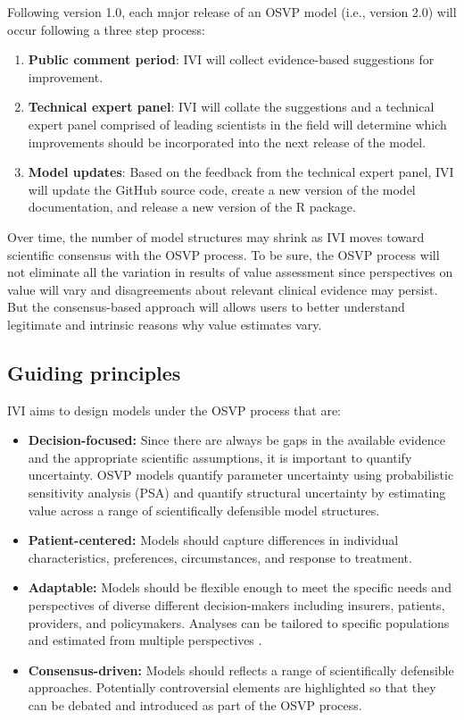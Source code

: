 \documentclass[11pt,final,fleqn]{article}\usepackage[]{graphicx}\usepackage[]{color}
\theoremstyle{plain}
\begin{document}
Following version 1.0, each major release of an OSVP model (i.e., version 2.0) will occur following a three step process:

\begin{enumerate}
\item \textbf{Public comment period}: IVI will collect evidence-based suggestions for improvement. 
\item \textbf{Technical expert panel}: IVI will collate the suggestions and a technical expert panel comprised of leading scientists in the field will determine which improvements should be incorporated into the next release of the model.
\item \textbf{Model updates}: Based on the feedback from the technical expert panel, IVI will update the GitHub source code, create a new version of the model documentation, and release a new version of the R package. 
\end{enumerate}

Over time, the number of model structures may shrink as IVI moves toward scientific consensus with the OSVP process. To be sure, the OSVP process will not eliminate all the variation in results of value assessment since perspectives on value will vary and disagreements about relevant clinical evidence may persist. But the consensus-based approach will allows users to better understand legitimate and intrinsic reasons why value estimates vary.

\subsection*{Guiding principles}
IVI aims to design models under the OSVP process that are:

\begin{itemize}
\item \textbf{Decision-focused:} Since there are always be gaps in the available evidence and the appropriate scientific assumptions, it is important to quantify uncertainty. OSVP models quantify parameter uncertainty using probabilistic sensitivity analysis (PSA) and quantify structural uncertainty by estimating value across a range of scientifically defensible model structures.
\item \textbf{Patient-centered:} Models should capture differences in individual characteristics, preferences, circumstances, and response to treatment.
\item \textbf{Adaptable:} Models should be flexible enough to meet the specific needs and perspectives of diverse different decision-makers including insurers, patients, providers, and policymakers. Analyses can be tailored to specific populations and estimated from multiple perspectives \citep{sanders2016recommendations, ioannidis2011individualized}.
\item \textbf{Consensus-driven:} Models should reflects a range of scientifically defensible approaches. Potentially controversial elements are highlighted so that they can be debated and introduced as part of the OSVP process. 
\end{itemize}
\end{document}
